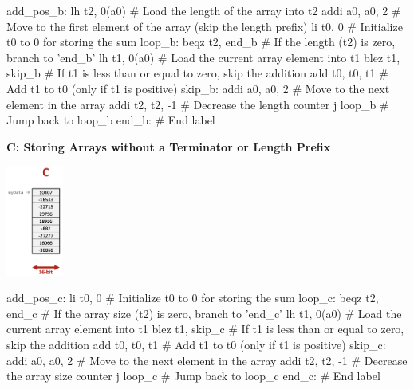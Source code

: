 \begin{center}
\begin{assembly}
add_pos_b:  
    lh t2, 0(a0)        # Load the length of the array into t2
    addi a0, a0, 2      # Move to the first element of the array (skip the length prefix)
    li t0, 0            # Initialize t0 to 0 for storing the sum
loop_b:    
    beqz t2, end_b      # If the length (t2) is zero, branch to 'end_b'
    lh t1, 0(a0)        # Load the current array element into t1
    blez t1, skip_b     # If t1 is less than or equal to zero, skip the addition
    add t0, t0, t1      # Add t1 to t0 (only if t1 is positive)
skip_b:    
    addi a0, a0, 2      # Move to the next element in the array
    addi t2, t2, -1     # Decrease the length counter
    j loop_b            # Jump back to loop_b
end_b:                  # End label
\end{assembly}
\end{center}
\textbf{C: Storing Arrays without a Terminator or Length Prefix} \\
\begin{center}
    \includegraphics[width=0.14\textwidth]{chapters/chapter1d/images/C.png}
\end{center}

\begin{center}
\begin{assembly}
add_pos_c:  
    li t0, 0         # Initialize t0 to 0 for storing the sum
loop_c:     
    beqz t2, end_c   # If the array size (t2) is zero, branch to 'end_c'
    lh t1, 0(a0)     # Load the current array element into t1
    blez t1, skip_c  # If t1 is less than or equal to zero, skip the addition
    add t0, t0, t1   # Add t1 to t0 (only if t1 is positive)
skip_c:    
    addi a0, a0, 2   # Move to the next element in the array
    addi t2, t2, -1  # Decrease the array size counter
    j loop_c         # Jump back to loop_c
end_c:               # End label
\end{assembly}
\end{center}

